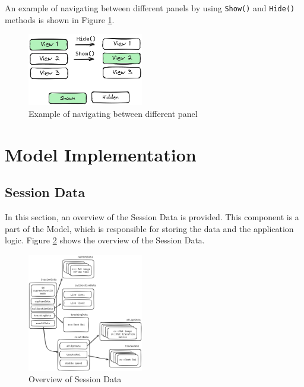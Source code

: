 An example of navigating between different panels by using \texttt{Show()} and \texttt{Hide()} methods is shown in Figure \ref{fig:show_panel}.

\begin{figure}[!ht]
    \centering
    \includegraphics[width=0.45\textwidth]{texs/Part2/chapter4/image/showpanel.png}
    \caption{Example of navigating between different panel}
    \label{fig:show_panel}
\end{figure}

\section{Model Implementation}
\label{sec:model_implementation}

\subsection{Session Data}
\label{subsec:session_data}

In this section, an overview of the Session Data is provided. This component is a part of the Model, which is responsible for storing the data and the application logic. Figure \ref{fig:sessiondata_overview} shows the overview of the Session Data.

\begin{figure}[!ht]
    \centering
    \includegraphics[width=0.45\textwidth]{texs/Part2/chapter4/image/sessiondata.png}
    \caption{Overview of Session Data}
    \label{fig:sessiondata_overview}
\end{figure}


